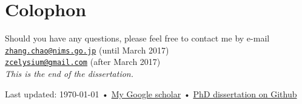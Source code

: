 \chapter*{Colophon}


\begin{center}


Should you have any questions, please feel free to contact me by e-mail\\
\href{mailto:zhang.chao@nims.go.jp}{\nolinkurl{zhang.chao@nims.go.jp}} (until March 2017)\\
\href{mailto:zcelysium@gmail.com}{\nolinkurl{zcelysium@gmail.com}} (after March 2017)\\[10ex]
\emph{This is the end of the dissertation. } \\

\vfill{}

{\scriptsize  Last updated: \today\- •\- 
\href{https://scholar.google.com/citations?hl=en&user=_tirUeIAAAAJ&view_op=list_works&sortby=pubdate}{My Google scholar}}\- •\- 
\href{https://github.com/zczczcle/PhDDissertation}{PhD dissertation on Github}

\end{center}